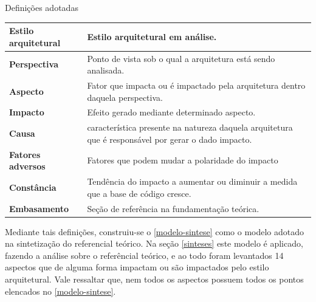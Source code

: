 \begin{quadro}
    \caption{Definições adotadas\label{quad:sintese-definicoes}}
    \begin{tabularx}{\linewidth}{ | p{5cm} | X | }
    \hline
    \textbf{Estilo arquitetural} & Estilo arquitetural em análise. \\ \hline
    \textbf{Perspectiva}         & Ponto de vista sob o qual a arquitetura está sendo analisada. \\ \hline
    \textbf{Aspecto}             & Fator que impacta ou é impactado pela arquitetura dentro daquela perspectiva. \\ \hline
    \textbf{Impacto}             & Efeito gerado mediante determinado aspecto. \\ \hline
    \textbf{Causa}               & característica presente na natureza daquela arquitetura que é responsável por gerar o dado impacto. \\ \hline
    \textbf{Fatores adversos}    & Fatores que podem mudar a polaridade do impacto \\ \hline
    \textbf{Constância}          & Tendência do impacto a aumentar ou diminuir a medida que a base de código cresce. \\ \hline
    \textbf{Embasamento}         & Seção de referência na fundamentação teórica. \\ \hline
    \end{tabularx}
\end{quadro}

Mediante tais definições, construiu-se o \autoref{modelo-sintese} como o modelo adotado na
sintetização do referencial teórico. Na seção \autoref{sinteses} este modelo é aplicado, fazendo a
análise sobre o referêncial teórico, e ao todo foram levantados 14 aspectos que de alguma forma
impactam ou são impactados pelo estilo arquitetural. Vale ressaltar que, nem todos os aspectos
possuem todos os pontos elencados no \autoref{modelo-sintese}.

